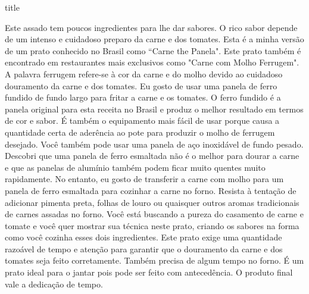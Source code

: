 \documentclass [11pt, letterpaper] {article}
\begin{document}
 {title}

Este assado tem poucos ingredientes para lhe dar sabores. O rico sabor depende de um intenso e cuidadoso preparo da carne e dos tomates. Esta é a minha versão de um prato conhecido no Brasil como ``Carne the Panela". Este prato também é encontrado em restaurantes mais exclusivos como "Carne com Molho Ferrugem". A palavra ferrugem refere-se à cor da carne e do molho devido ao cuidadoso douramento da carne e dos tomates. Eu gosto de usar uma panela de ferro fundido de fundo largo para fritar a carne e os tomates. O ferro fundido é a panela original para esta receita no Brasil e produz o melhor resultado em termos de cor e sabor. É também o equipamento mais fácil de usar porque causa a quantidade certa de aderência ao pote para produzir o molho de ferrugem desejado. Você também pode usar uma panela de aço inoxidável de fundo pesado. Descobri que uma panela de ferro esmaltada não é o melhor para dourar a carne e que as panelas de alumínio tamb\'em podem
ficar muito quentes muito rapidamente. No entanto, eu gosto de transferir a carne com molho para um panela de ferro esmaltada para cozinhar a carne no forno. Resista à tentação de adicionar pimenta preta, folhas de louro ou quaisquer outros aromas tradicionais de carnes assadas no forno. Você está buscando a pureza do casamento de carne e tomate e você quer mostrar sua técnica neste prato, criando os sabores na forma como você cozinha esses dois ingredientes. Este prato exige uma quantidade razoável de tempo e atenção para garantir que o douramento da carne e dos tomates seja feito corretamente. Também precisa de algum tempo no forno. É um prato ideal para o jantar pois pode ser feito com anteced\^encia. O produto final vale a dedicação de tempo.
 
\end{document}
